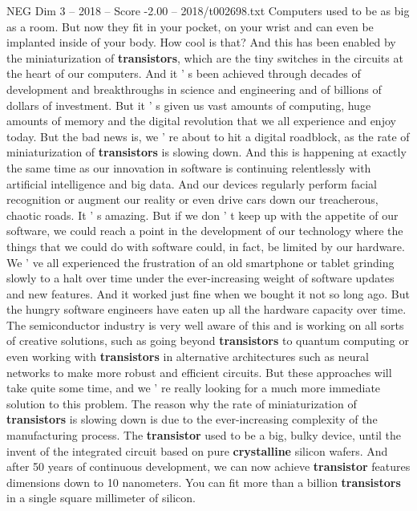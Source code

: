 \begin{textsample}{NEG Dim 3 – 2018 – Score -2.00 – 2018/t002698.txt}  \label{ex:f3_neg_064}
Computers used to be as big as a room.
But now they fit in your pocket, on your wrist and can even be implanted inside of your body.
How cool is that?
And this has been enabled by the miniaturization of \textbf{transistors}, which are the tiny switches in the circuits at the heart of our computers.
And it ' s been achieved through decades of development and breakthroughs in science and engineering and of billions of dollars of investment.
But it ' s given us vast amounts of computing, huge amounts of memory and the digital revolution that we all experience and enjoy today.
But the bad news is, we ' re about to hit a digital roadblock, as the rate of miniaturization of \textbf{transistors} is slowing down.
And this is happening at exactly the same time as our innovation in software is continuing relentlessly with artificial intelligence and big data.
And our devices regularly perform facial recognition or augment our reality or even drive cars down our treacherous, chaotic roads.
It ' s amazing.
But if we don ' t keep up with the appetite of our software, we could reach a point in the development of our technology where the things that we could do with software could, in fact, be limited by our hardware.
We ' ve all experienced the frustration of an old smartphone or tablet grinding slowly to a halt over time under the ever-increasing weight of software updates and new features.
And it worked just fine when we bought it not so long ago.
But the hungry software engineers have eaten up all the hardware capacity over time.
The semiconductor industry is very well aware of this and is working on all sorts of creative solutions, such as going beyond \textbf{transistors} to quantum computing or even working with \textbf{transistors} in alternative architectures such as neural networks to make more robust and efficient circuits.
But these approaches will take quite some time, and we ' re really looking for a much more immediate solution to this problem.
The reason why the rate of miniaturization of \textbf{transistors} is slowing down is due to the ever-increasing complexity of the manufacturing process.
The \textbf{transistor} used to be a big, bulky device, until the invent of the integrated circuit based on pure \textbf{crystalline} silicon wafers.
And after 50 years of continuous development, we can now achieve \textbf{transistor} features dimensions down to 10 nanometers.
You can fit more than a billion \textbf{transistors} in a single square millimeter of silicon.

\end{textsample}
